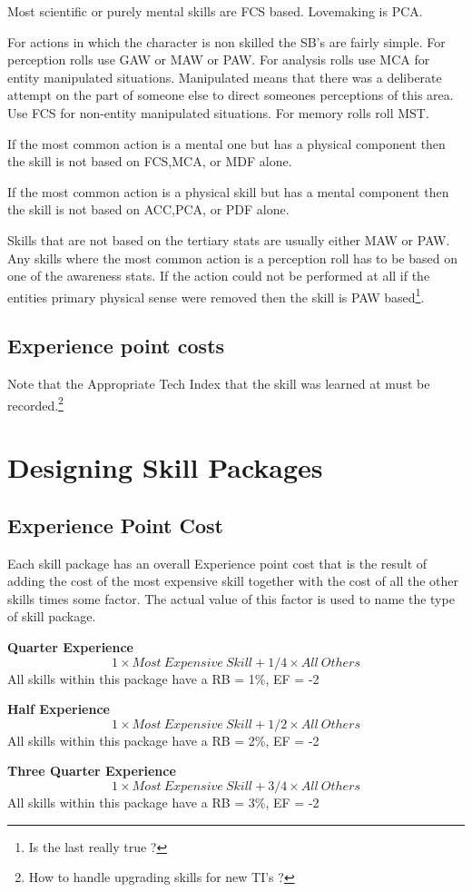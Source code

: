 Most scientific or purely mental skills are FCS based.
Lovemaking is PCA.

For actions in which the character is non skilled the SB's are fairly
simple. For perception rolls use GAW or MAW or PAW. For analysis rolls
use MCA for entity manipulated situations. Manipulated means that there
was a deliberate attempt on the part of someone else to direct someones
perceptions of this area. Use FCS for non-entity manipulated
situations. For memory rolls roll MST.

If the most common action is a mental one but has a physical component then
the skill is not based on FCS,MCA, or MDF alone.

If the most common action is a physical skill but has a mental component then the
skill is not based on ACC,PCA, or PDF alone.

Skills that are not based on the tertiary stats are usually either MAW
or PAW. Any skills where the most common action is a perception roll has
to be based on one of the awareness stats. If the action could not be
performed at all if the entities primary physical sense were removed
then the skill is PAW based\footnote{Is the last really true ?}.

\subsection{Experience point costs}

Note that the Appropriate Tech Index that the skill was learned at
must be recorded.\footnote{ How to handle upgrading skills for new TI's ?}

\section{Designing Skill Packages}

\subsection{Experience Point Cost}

Each skill package has an overall Experience point cost that is
the result of adding the cost of the most expensive skill together
with the cost of all the other skills times some factor. The actual value
of this factor is used to name the type of skill package.

{\bf Quarter Experience}
\[ 1 \times Most\ Expensive\ Skill + 1/4 \times All\ Others \]
All skills within this package have a RB = 1\%, EF = -2

{\bf Half Experience }
\[ 1 \times Most\ Expensive\ Skill + 1/2 \times All\ Others \]
All skills within this package have a RB = 2\%, EF = -2

{\bf Three Quarter Experience}
\[ 1 \times Most\ Expensive\ Skill + 3/4 \times All\ Others \]
All skills within this package have a RB = 3\%, EF = -2


